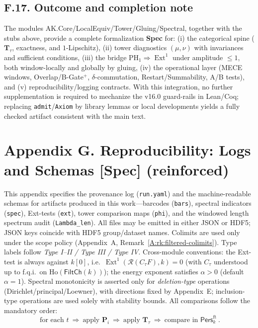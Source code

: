 \documentclass[11pt]{article}
\numberwithin{equation}{section}
\theoremstyle{plain}
\theoremstyle{definition}
\theoremstyle{remark}
\DeclareMathOperator{\Ext}{Ext}
\DeclareRobustCommand{\hyp}{\nobreakdash-}
\newcommand{\Pers}{\mathsf{Pers}}
\newcommand{\Ho}{\mathrm{Ho}}
\theoremstyle{plain}
\theoremstyle{definition}
\numberwithin{equation}{section}
\theoremstyle{definition}
\numberwithin{equation}{section}
\theoremstyle{plain}
\theoremstyle{definition}
\theoremstyle{remark}
\begin{document}
\subsection*{F.17. Outcome and completion note}

The modules AK.Core/LocalEquiv/Tower/Gluing/Spectral, together with the stubs above, provide a complete formalization \textbf{Spec} for:
(i) the categorical spine (\(\mathbf{T}_\tau\), exactness, and \(1\)\hyp Lipschitz),
(ii) tower diagnostics \((\mu,\nu)\) with invariances and sufficient conditions,
(iii) the bridge \(\mathrm{PH}_1\Rightarrow \Ext^1\) under amplitude \(\le 1\), both window-locally and globally by gluing,
(iv) the operational layer (MECE windows, Overlap/B\hyp Gate\(^{+}\), \(\delta\)\hyp commutation, Restart/Summability, A/B tests), and
(v) reproducibility/logging contracts.
With this integration, no further supplementation is required to mechanize the v16.0 guard-rails in Lean/Coq; replacing \texttt{admit}/\texttt{Axiom} by library lemmas or local developments yields a fully checked artifact consistent with the main text.



\section*{Appendix G. Reproducibility: Logs and Schemas [Spec] (reinforced)}
{}
\label{G:repro}

This appendix specifies the provenance log (\texttt{run.yaml}) and the machine-readable
schemas for artifacts produced in this work—barcodes (\texttt{bars}), spectral indicators
(\texttt{spec}), Ext-tests (\texttt{ext}), tower comparison maps (\texttt{phi}), and the windowed
length spectrum audit (\texttt{Lambda\_len}).
All files may be emitted in either JSON or HDF5; JSON keys coincide with HDF5
group/dataset names. Colimits are used only under the scope policy
(Appendix~A, Remark~\ref{A:rk:filtered-colimits}). Type labels follow \emph{Type I--II / Type III / Type IV}.
Cross-module conventions: the Ext-test is always against \(k[0]\), i.e.\ \(\Ext^1(\mathcal{R}(C_\tau F),k)=0\)
(with \(C_\tau\) understood up to f.q.i.\ on \(\Ho(\mathsf{FiltCh}(k))\)); the energy exponent satisfies
\(\alpha>0\) (default \(\alpha=1\)). Spectral monotonicity is asserted only for \emph{deletion-type} operations
(Dirichlet/principal/Loewner), with directions fixed by Appendix~E; inclusion-type operations
are used solely with stability bounds. All comparisons follow the mandatory order:
\[
\boxed{\ \text{for each } t\ \Longrightarrow\ \text{apply } \mathbf{P}_i \ \Longrightarrow\ \text{apply } \mathbf{T}_\tau \ \Longrightarrow\ \text{compare in }\Pers^{\mathrm{ft}}_k\ }.
\]
\end{document}

